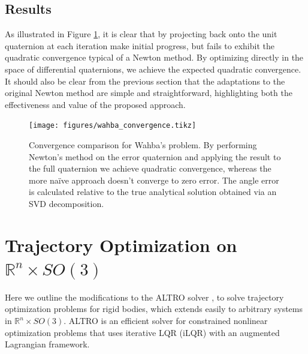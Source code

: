 \documentclass[letterpaper, 10 pt, conference]{ieeeconf}  %
\newcommand{\R}{\mathbb{R}}
\begin{document}
    \subsection{Results}
    As illustrated in Figure \ref{fig:wahba_convergence}, it is clear that by projecting 
    back onto the unit quaternion at each iteration make initial progress, but fails to 
    exhibit the quadratic convergence typical of a Newton method. By optimizing directly 
    in the space of differential quaternions, we achieve the expected quadratic convergence.
    It should also be clear from the previous section that the adaptations to the original
    Newton method are simple and straightforward, highlighting both the effectiveness and
    value of the proposed approach.
    \begin{figure}

        \centering
        \texttt{[image: figures/wahba\_convergence.tikz]}
        \caption{Convergence comparison for Wahba's problem. By performing Newton's method
        on the error quaternion and applying the result to the full quaternion we achieve
        quadratic convergence, whereas the more na\"ive approach doesn't converge to zero
        error. The angle error is calculated relative to the true analytical solution obtained
        via an SVD decomposition.}
        \label{fig:wahba_convergence}
    \end{figure}

\section{Trajectory Optimization on $\R^n \times SO(3)$} \label{sec:trajopt}
    Here we outline the modifications to the ALTRO solver \cite{howell2019altro}, to
    solve trajectory optimization problems for rigid bodies, which extends easily to
    arbitrary systems in $\R^n \times SO(3)$. ALTRO is an efficient solver for constrained
    nonlinear optimization problems that uses iterative LQR (iLQR) with an augmented
    Lagrangian framework.
\end{document}
